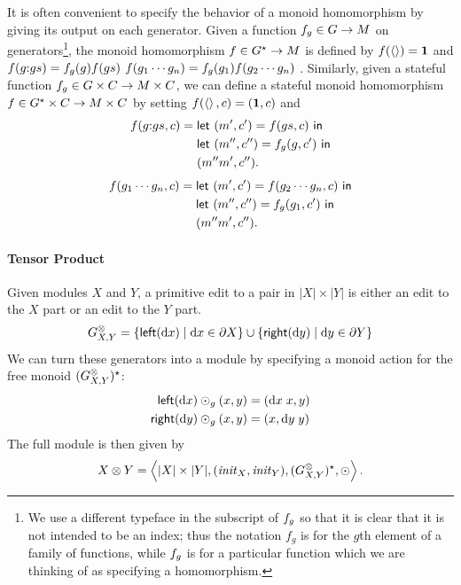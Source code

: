It is often convenient to specify the behavior of a monoid
homomorphism by giving its output on each generator.
\fi
Given a function $f_g \in G \to M$ on
generators\ifdissertation\footnote{We use a different typeface in the
    subscript of $f_g$ so that it is clear that it is not intended to be
    an index; thus the notation $f_g$ is for the $g$th element of a family
    of functions, while $f_g$ is for a particular function which we are
    thinking of as specifying a homomorphism.}\fi, the monoid homomorphism $f
\in G^\star \to M$ is defined by $f(\left<\right>)=\mbox{\bf{1}}$ and
\ifdissertation
$f(g \mathord{:} gs)=f_g(g)f(gs)$%
\else
$f(g_1 \cdots g_n)=f_g(g_1)f(g_2 \cdots g_n)$%
\fi. Similarly, given a
stateful function $f_g \in G \times C \to M \times C$, we can define a
stateful monoid homomorphism $f \in G^\star \times C \to M \times C$ by setting
$f(\left<\right>,c) = (\mbox{\bf{1}},c)$ and
\ifdissertation
\begin{align*}
    f(g \mathord{:} gs,c) ={}& \mathsf{let}\  (m',c') = f(gs,c) \ \mathsf{in} \\
    & \mathsf{let}\  (m'',c'') = f_g(g,c') \ \mathsf{in} \\
    & (m''m',c'')
.
\end{align*}
\else
\begin{align*}
    f(g_1 \cdots g_n,c) ={}& \mathsf{let}\  (m',c') = f(g_2 \cdots g_n,c) \ \mathsf{in} \\
    & \mathsf{let}\  (m'',c'') = f_g(g_1,c') \ \mathsf{in} \\
    & (m''m',c'')
.
\end{align*}
\fi

\paragraph*{Tensor Product}

Given modules $X$ and $Y$, a primitive edit to a pair in $|X| \times |Y|$
is either an edit to the $X$ part or an edit to the $Y$ part.  
\[G^\otimes_{X,Y} = \{\mathsf{left}(\textrm{d} x) \mid \textrm{d} x \in \partial X\} \cup
                    \{\mathsf{right}(\textrm{d} y) \mid \textrm{d} y \in \partial Y\}\]
We can turn these generators into a module by specifying a monoid
action for the free monoid $(G^\otimes_{X,Y})^\star$:
\begin{align*}
    \mathsf{left}(\textrm{d} x) \odot_g (x,y) &= (\textrm{d} x\;x,y) \\
    \mathsf{right}(\textrm{d} y) \odot_g (x,y) &= (x,\textrm{d} y\;y)
\end{align*}
The full module is then given by
\[X \otimes Y =
\left<|X|\times|Y|,(\init_X,\init_Y),(G^\otimes_{X,Y})\LIST,\odot\right>.\]

